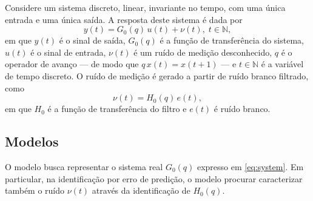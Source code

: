 \documentclass{ppgeesa}
\newcommand{\Prod}{\,}
\begin{document}
Considere um sistema discreto, linear, invariante no tempo, com uma única entrada e uma única saída.
A resposta deste sistema é dada por
\begin{equation}\label{eq:system}
  y(t) = G_0(q) \Prod u(t) + \nu(t)
  ,\; t \in \mathbb{N}
  ,
\end{equation}
em que
$y(t)$ é o sinal de saída,
$G_0(q)$ é a função de transferência do sistema,
$u(t)$ é o sinal de entrada,
$\nu(t)$ é um ruído de medição desconhecido, %
$q$ é o operador de avanço --- de modo que $q \Prod x(t) = x(t+1)$ --- e
$t \in \mathbb{N}$ é a variável de tempo discreto.
O ruído de medição é gerado a partir de ruído branco filtrado, como
\begin{equation}
  \nu(t) = H_0(q) \Prod e(t)
  ,
\end{equation}
em que
$H_0$ é a função de transferência do filtro e
$e(t)$ é ruído branco.

\subsection{Modelos}

O modelo busca representar o sistema real $G_0(q)$ expresso em \eqref{eq:system}.
Em particular, na identificação por erro de predição, o modelo procurar caracterizar também o ruído $\nu(t)$ através da identificação de $H_0(q)$.
\end{document}
